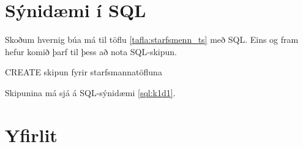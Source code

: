 \section{Sýnidæmi í SQL}
\label{undirkafli:synidaemi_i_sql}
Skoðum hvernig búa má til töflu \ref{tafla:starfsmenn_ts} með SQL. Eins og fram hefur komið þarf til þess að nota SQL-skipun.

\begin{example}[h]
\caption{CREATE skipun fyrir starfsmannatöfluna}
\label{sql:k1d1}
\centering
{}
\end{example}

Skipunina má sjá á SQL-sýnidæmi \ref{sql:k1d1}.

\section{Yfirlit}